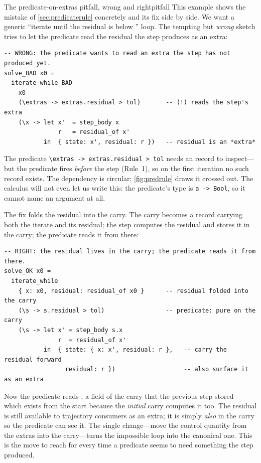 \begin{workedexample}{The predicate-on-extras pitfall, wrong and right}{pitfall}
This example shows the mistake of \cref{sec:predicaterule} concretely and its fix
side by side. We want a generic ``iterate until the residual is below
'' loop. The tempting but \emph{wrong} sketch tries to let the predicate
read the residual the step produces as an extra:
\begin{lstlisting}[style=l4style]
-- WRONG: the predicate wants to read an extra the step has not produced yet.
solve_BAD x0 =
  iterate_while_BAD
    x0
    (\extras -> extras.residual > tol)       -- (!) reads the step's extra
    (\x -> let x'  = step_body x
               r   = residual_of x'
           in  { state: x', residual: r })   -- residual is an *extra*
\end{lstlisting}
The predicate \lstinline[style=l4style]|\extras -> extras.residual > tol| needs an
 record to inspect---but the predicate fires \emph{before} the step
(Rule~1), so on the first iteration no such record exists. The dependency is
circular; \cref{fig:predrule} draws it crossed out. The calculus will not even
let us write this: the predicate's type is \lstinline[style=l4style]|a -> Bool|,
so it cannot name an  argument at all.

The fix folds the residual into the carry. The carry becomes a record carrying
both the iterate and its residual; the step computes the residual and stores it
in the carry; the predicate reads it from there:
\begin{lstlisting}[style=l4style]
-- RIGHT: the residual lives in the carry; the predicate reads it from there.
solve_OK x0 =
  iterate_while
    { x: x0, residual: residual_of x0 }      -- residual folded into the carry
    (\s -> s.residual > tol)                 -- predicate: pure on the carry
    (\s -> let x' = step_body s.x
               r  = residual_of x'
           in  { state: { x: x', residual: r },   -- carry the residual forward
                 residual: r })                   -- also surface it as an extra
\end{lstlisting}
Now the predicate reads , a field of the carry that the previous
step stored---which exists from the start because the \emph{initial} carry
computes it too. The residual is still available to trajectory consumers as an
extra; it is simply \emph{also} in the carry so the predicate can see it. The
single change---move the control quantity from the extras into the carry---turns
the impossible loop into the canonical one. This is the move to reach for every
time a predicate seems to need something the step produced.
\end{workedexample}

